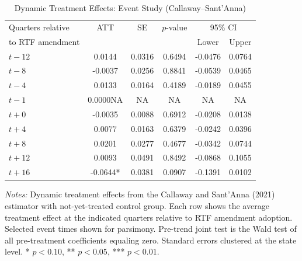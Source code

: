 \begin{table}[H]
\centering
\caption{Dynamic Treatment Effects: Event Study (Callaway--Sant'Anna)}
\label{tab:eventstudy}
\begin{threeparttable}
\begin{tabular}{lccccc}
\toprule
Quarters relative & ATT & SE & $p$-value & \multicolumn{2}{c}{95\% CI} \\
to RTF amendment & & & & Lower & Upper \\
\midrule
$t-12$ & 0.0144 & 0.0316 & 0.6494 & -0.0476 & 0.0764 \\
$t-8$ & -0.0037 & 0.0256 & 0.8841 & -0.0539 & 0.0465 \\
$t-4$ & 0.0133 & 0.0164 & 0.4189 & -0.0189 & 0.0455 \\
$t-1$ & 0.0000NA &    NA &    NA &    NA &    NA \\
$t+0$ & -0.0035 & 0.0088 & 0.6912 & -0.0208 & 0.0138 \\
$t+4$ & 0.0077 & 0.0163 & 0.6379 & -0.0242 & 0.0396 \\
$t+8$ & 0.0201 & 0.0277 & 0.4677 & -0.0342 & 0.0744 \\
$t+12$ & 0.0093 & 0.0491 & 0.8492 & -0.0868 & 0.1055 \\
$t+16$ & -0.0644* & 0.0381 & 0.0907 & -0.1391 & 0.0102 \\
\midrule
\bottomrule
\end{tabular}
\begin{tablenotes}[flushleft]
\small
\item \textit{Notes:} Dynamic treatment effects from the Callaway and Sant'Anna (2021) estimator with not-yet-treated control group. Each row shows the average treatment effect at the indicated quarters relative to RTF amendment adoption. Selected event times shown for parsimony. Pre-trend joint test is the Wald test of all pre-treatment coefficients equaling zero. Standard errors clustered at the state level. * $p<0.10$, ** $p<0.05$, *** $p<0.01$.
\end{tablenotes}
\end{threeparttable}
\end{table}
